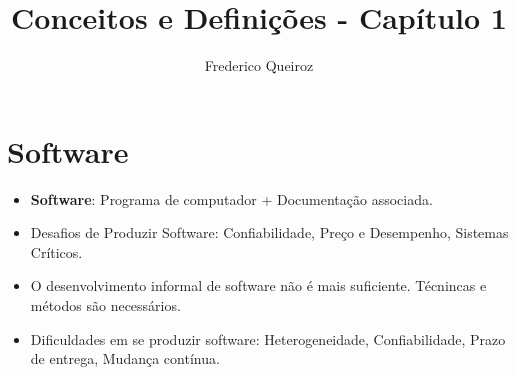\documentclass[a4paper, 11pt]{article}
\author{Frederico Queiroz}
\title{Conceitos e Definições - Capítulo 1}
\begin{document}
\maketitle


\section{Software}
\begin{itemize}
	\item \textbf{Software}: Programa de computador + Documentação associada.
	\item Desafios de Produzir Software: Confiabilidade, Preço e Desempenho, Sistemas Críticos.
	\item O desenvolvimento informal de software não é mais suficiente. Técnincas e métodos são necessários.
	\item Dificuldades em se produzir software: Heterogeneidade, Confiabilidade, Prazo de entrega, Mudança contínua.
\end{itemize}
\end{document}
